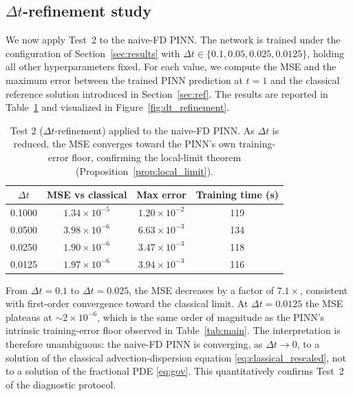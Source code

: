 \documentclass[11pt]{article}
\begin{document}
\subsection{\(\Delta t\)-refinement study}
\label{sec:dt_refinement_study}

We now apply Test~2 to the naive-FD PINN. The network is trained under
the configuration of Section~\ref{sec:results} with \(\Delta t \in
\{0.1, 0.05, 0.025, 0.0125\}\), holding all other hyperparameters fixed.
For each value, we compute the MSE and the maximum error between the
trained PINN prediction at \(t=1\) and the classical reference solution
introduced in Section~\ref{sec:ref}. The results are reported in
Table~\ref{tab:dt_refinement} and visualized in
Figure~\ref{fig:dt_refinement}.

\begin{table}[h]
\centering
\caption{Test 2 (\(\Delta t\)-refinement) applied to the naive-FD PINN.
         As \(\Delta t\) is reduced, the MSE converges toward the PINN's
         own training-error floor, confirming the local-limit theorem
         (Proposition~\ref{prop:local_limit}).}
\label{tab:dt_refinement}
\begin{tabular}{cccc}
\toprule
\(\Delta t\) & MSE vs classical & Max error & Training time (s) \\
\midrule
0.1000 & \(1.34\times 10^{-5}\) & \(1.20\times 10^{-2}\) & 119 \\
0.0500 & \(3.98\times 10^{-6}\) & \(6.63\times 10^{-3}\) & 134 \\
0.0250 & \(1.90\times 10^{-6}\) & \(3.47\times 10^{-3}\) & 118 \\
0.0125 & \(1.97\times 10^{-6}\) & \(3.94\times 10^{-3}\) & 116 \\
\bottomrule
\end{tabular}
\end{table}

From \(\Delta t = 0.1\) to \(\Delta t = 0.025\), the MSE decreases by
a factor of \(7.1\times\), consistent with first-order convergence
toward the classical limit. At \(\Delta t = 0.0125\) the MSE plateaus
at \(\sim 2\times 10^{-6}\), which is the same order of magnitude as
the PINN's intrinsic training-error floor observed in
Table~\ref{tab:main}. The interpretation is therefore unambiguous: the
naive-FD PINN is converging, as \(\Delta t\to 0\), to a solution of the
classical advection-dispersion equation \eqref{eq:classical_rescaled},
not to a solution of the fractional PDE \eqref{eq:gov}. This
quantitatively confirms Test~2 of the diagnostic protocol.
\end{document}
